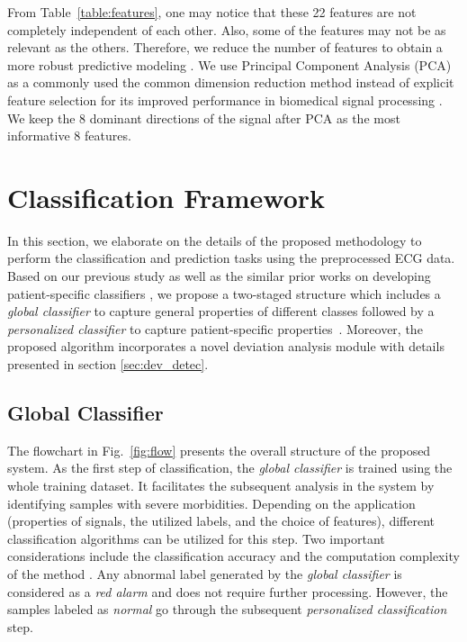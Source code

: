 From Table~\ref{table:features}, one may notice that these 22 features are not completely independent of each other. Also, some of the features may not be as relevant as the others. Therefore, we reduce the number of features to obtain a more robust predictive modeling \cite{autofs, llamedo2012automatic}. We use Principal Component Analysis (PCA) %
as a commonly used the common dimension reduction method instead of explicit feature selection for its improved performance in biomedical signal processing \cite{castells2007principal,martis2013ecg}. We keep the 8 dominant directions of the signal after PCA as the most informative 8 features.



\section{Classification Framework}


In this section, we elaborate on the details of the proposed methodology to perform the classification and prediction tasks using the preprocessed ECG data. Based on our previous study \cite{chen2018predictive} as well as the similar prior works on developing patient-specific classifiers \cite{Hu_et_al,deChazal2006,llamedo2012automatic}, we propose a two-staged structure which includes a \textit{global classifier} to capture general properties of different classes followed by a \textit{personalized classifier} to capture patient-specific properties~\cite{chen2018predictive,Hu_et_al,deChazal2006,llamedo2012automatic}. Moreover, the proposed algorithm incorporates a novel deviation analysis module with details presented in section \ref{sec:dev_detec}. 

\subsection{Global Classifier}

The flowchart in Fig.~\ref{fig:flow} presents the overall structure of the proposed system. As the first step of classification, the \textit{global classifier} is trained using the whole training dataset. It facilitates the subsequent analysis in the system by identifying samples with severe morbidities. Depending on the application (properties of signals, the utilized labels, and the choice of features), different classification algorithms can be utilized \cite{Hu_et_al,llamedo2012automatic} for this step. Two important considerations include the classification accuracy and the computation complexity of the method \cite{llamedo2012automatic}. Any abnormal label generated by the \textit{global classifier} is considered as a \textit{red alarm} and does not require further processing. However, the samples labeled as \textit{normal} go through the subsequent \textit{personalized classification} step. 

